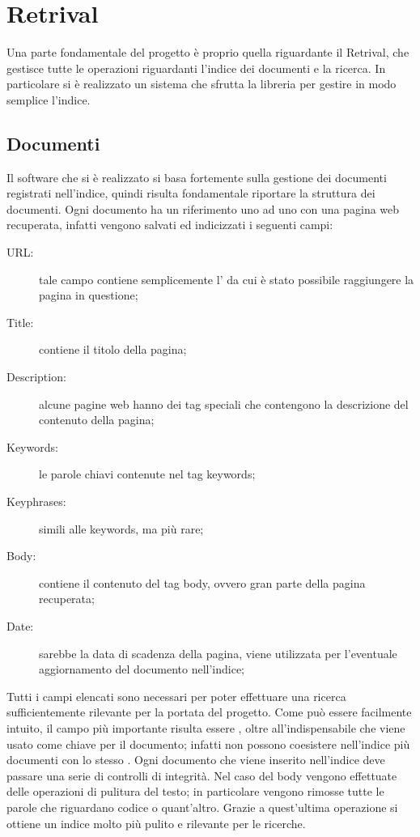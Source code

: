 \chapter{Retrival}\label{cap:retrival}
Una parte fondamentale del progetto è proprio quella riguardante il Retrival, che gestisce tutte le operazioni riguardanti l'indice dei documenti e la ricerca. In particolare si è realizzato un sistema che sfrutta la libreria  per gestire in modo semplice l'indice.
\section{Documenti}\label{cap:retrival:docs}
Il software che si è realizzato si basa fortemente sulla gestione dei documenti registrati nell'indice, quindi risulta fondamentale riportare la struttura dei documenti.
Ogni documento ha un riferimento uno ad uno con una pagina web recuperata, infatti vengono salvati ed indicizzati i seguenti campi:
\begin{description}
\item[URL:] tale campo contiene semplicemente l' da cui è stato possibile raggiungere la pagina in questione;
\item[Title:] contiene il titolo della pagina;
\item[Description:] alcune pagine web hanno dei tag speciali che contengono la descrizione del contenuto della pagina;
\item[Keywords:] le parole chiavi contenute nel tag keywords;
\item[Keyphrases:] simili alle keywords, ma più rare;
\item[Body:] contiene il contenuto del tag body, ovvero gran parte della pagina recuperata;
\item[Date:] sarebbe la data di scadenza della pagina, viene utilizzata per l'eventuale aggiornamento del documento nell'indice;
\end{description}
Tutti i campi elencati sono necessari per poter effettuare una ricerca sufficientemente rilevante per la portata del progetto. Come può essere facilmente intuito, il campo più importante risulta essere , oltre all'indispensabile  che viene usato come chiave per il documento; infatti non possono coesistere nell'indice più documenti con lo stesso .
Ogni documento che viene inserito nell'indice deve passare una serie di controlli di integrità. Nel caso del body vengono effettuate delle operazioni di pulitura del testo; in particolare vengono rimosse tutte le parole che riguardano codice o quant'altro. Grazie a quest'ultima operazione si ottiene un indice molto più pulito e rilevante per le ricerche.
